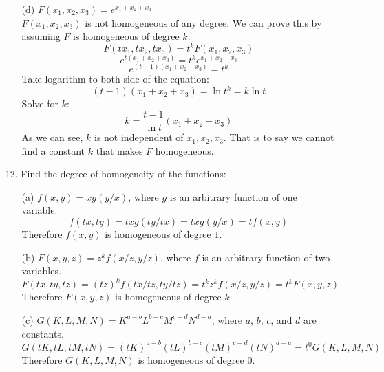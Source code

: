 \documentclass{article}
\begin{document}
\begin{enumerate}
\begin{enumerate}
            \item[(d)] $F(x_1, x_2, x_3) = e^{x_1+x_2+x_3}$ \\
            
            $F(x_1, x_2, x_3)$ is not homogeneous of any degree. 
            We can prove this by assuming $F$ is homogeneous of degree $k$:
            $$ F(tx_1, tx_2, tx_3)=t^kF(x_1, x_2, x_3) $$
            $$ e^{t(x_1+x_2+x_3)} = t^ke^{x_1+x_2+x_3} $$
            $$ e^{(t-1)(x_1+x_2+x_3)} = t^k $$
            Take logarithm to both side of the equation:
            $$ (t-1)(x_1+x_2+x_3) = \ln{t^k} = k\ln{t} $$
            Solve for $k$:
            $$ k = \frac{t-1}{\ln{t}}(x_1+x_2+x_3) $$
            As we can see, $k$ is not independent of $x_1, x_2, x_3$. That is to say we cannot find a constant $k$ that makes $F$ homogeneous.
        \end{enumerate}

    \item[12. ] Find the degree of homogeneity of the functions:
        \begin{enumerate}
            \item[(a)] $f(x, y) = xg(y/x)$, where $g$ is an arbitrary function of one variable.
            $$ f(tx, ty) = tx g(ty/tx) = tx g(y/x) = tf(x,y) $$
            Therefore $f(x,y)$ is homogeneous of degree $1$. \\
            
            \item[(b)] $F(x, y, z) = z^kf(x/z, y/z)$, where $f$ is an arbitrary function of two variables.
            $$ F(tx, ty,tz) = (tz)^kf(tx/tz,ty/tz) = t^kz^kf(x/z, y/z) = t^kF(x,y,z)$$
            Therefore $F(x,y,z)$ is homogeneous of degree $k$. \\
            
            \item[(c)] $G(K,L,M,N) = K^{a-b} L^{b-c} M^{c-d} N^{d-a}$, where $a$, $b$, $c$, and $d$ are constants.
            $$ G(tK,tL,tM,tN) = (tK)^{a-b} (tL)^{b-c} (tM)^{c-d} (tN)^{d-a} = t^0 G(K,L,M,N) $$
            Therefore $G(K,L,M,N)$ is homogeneous of degree $0$.\\
        \end{enumerate}
      
\end{enumerate}
\end{document}
